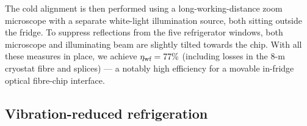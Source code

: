 \documentclass[./Main-revtex.tex]{subfiles}
\begin{document}
The cold alignment is then performed using a long-working-distance zoom microscope with a separate white-light illumination source, both sitting outside the fridge. To suppress reflections from the five refrigerator windows, both microscope and illuminating beam are slightly tilted towards the chip.
With all these measures in place, we achieve $\eta_\text{wf} = 77\%$ (including losses in the 8-m cryostat fibre and splices) --- a notably high efficiency for a movable in-fridge optical fibre-chip interface.


\subsection{Vibration-reduced refrigeration}
\end{document}
